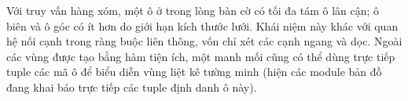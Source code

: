 \begin{sloppypar}
Với truy vấn hàng xóm, một ô ở trong lòng bàn cờ có tối đa tám ô lân cận; ô biên và ô góc có ít hơn do giới hạn kích thước lưới. Khái niệm này khác với quan hệ nối cạnh trong ràng buộc liên thông, vốn chỉ xét các cạnh ngang và dọc. Ngoài các vùng được tạo bằng hàm tiện ích, một manh mối cũng có thể dùng trực tiếp tuple các mã ô để biểu diễn vùng liệt kê tường minh (hiện các module bản đồ đang khai báo trực tiếp các tuple định danh ô này).
\end{sloppypar}
